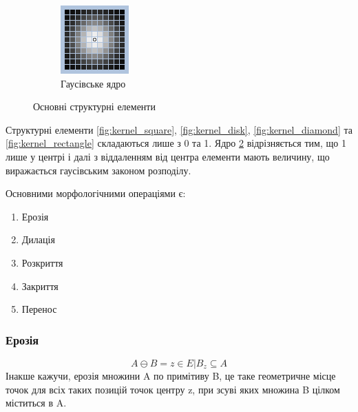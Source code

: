\begin{figure}[H]
\begin{subfigure}[b]{0.2\textwidth}
		\includegraphics[width=\textwidth]{theory/img/kernel_gauss}
		\caption{Гаусівське ядро}
		\label{fig:kernel_gauss}
	\end{subfigure}
	\caption{Основні структурні елементи}	
\end{figure}

Структурні елементи \ref{fig:kernel_square}, \ref{fig:kernel_disk}, \ref{fig:kernel_diamond} та \ref{fig:kernel_rectangle} складаються лише з 0 та 1. Ядро \ref{fig:kernel_gauss} відрізняється тим, що 1 лише у центрі і далі з віддаленням від центра елементи мають величину, що виражається гаусівським законом розподілу.

Основними морфологічними операціями є:
\begin{enumerate}
	\item Ерозія
	\item Дилація
	\item Розкриття
	\item Закриття
	\item Перенос
\end{enumerate}


\subsubsection{Ерозія}
	\begin{equation}
	A \ominus B = { z \in E | B_{z} \subseteq A}
	\end{equation}
	Інакше кажучи, ерозія множини A по примітиву B, це таке геометричне місце точок для всіх таких позицій точок центру z, при зсуві яких множина B цілком міститься в A.
	

